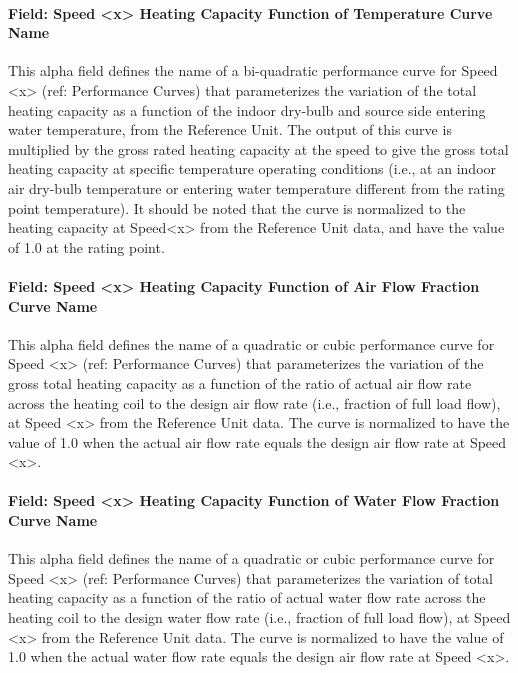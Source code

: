 \paragraph{Field: Speed \textless{}x\textgreater{} Heating Capacity Function of Temperature Curve Name}\label{field-speed-x-heating-capacity-function-of-temperature-curve-name-2}

This alpha field defines the name of a bi-quadratic performance curve for Speed \textless{}x\textgreater{} (ref: Performance Curves) that parameterizes the variation of the total heating capacity as a function of the indoor dry-bulb and source side entering water temperature, from the Reference Unit. The output of this curve is multiplied by the gross rated heating capacity at the speed to give the gross total heating capacity at specific temperature operating conditions (i.e., at an indoor air dry-bulb temperature or entering water temperature different from the rating point temperature). It should be noted that the curve is normalized to the heating capacity at Speed\textless{}x\textgreater{} from the Reference Unit data, and have the value of 1.0 at the rating point.

\paragraph{Field: Speed \textless{}x\textgreater{} Heating Capacity Function of Air Flow Fraction Curve Name}\label{field-speed-x-heating-capacity-function-of-air-flow-fraction-curve-name-1}

This alpha field defines the name of a quadratic or cubic performance curve for Speed \textless{}x\textgreater{} (ref: Performance Curves) that parameterizes the variation of the gross total heating capacity as a function of the ratio of actual air flow rate across the heating coil to the design air flow rate (i.e., fraction of full load flow), at Speed \textless{}x\textgreater{} from the Reference Unit data. The curve is normalized to have the value of 1.0 when the actual air flow rate equals the design air flow rate at Speed \textless{}x\textgreater{}.

\paragraph{Field: Speed \textless{}x\textgreater{} Heating Capacity Function of Water Flow Fraction Curve Name}\label{field-speed-x-heating-capacity-function-of-water-flow-fraction-curve-name}

This alpha field defines the name of a quadratic or cubic performance curve for Speed \textless{}x\textgreater{} (ref: Performance Curves) that parameterizes the variation of total heating capacity as a function of the ratio of actual water flow rate across the heating coil to the design water flow rate (i.e., fraction of full load flow), at Speed \textless{}x\textgreater{} from the Reference Unit data. The curve is normalized to have the value of 1.0 when the actual water flow rate equals the design air flow rate at Speed \textless{}x\textgreater{}.

